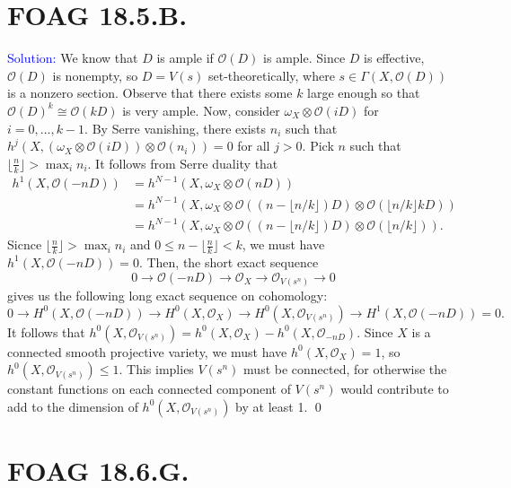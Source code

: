 \documentclass[11pt]{article}
\newcommand{\cO}{\mathcal{O}}
\newenvironment{solution}{\begin{trivlist}\item[]{\textcolor{blue}{Solution:}}}{\qed \end{trivlist}}
\begin{document}
\newpage

\section*{FOAG 18.5.B.}

\begin{solution}
    We know that $D$ is ample if $\cO(D)$ is ample. Since $D$ is effective, $\cO(D)$ is nonempty, so $D = V(s)$ set-theoretically, where $s \in \Gamma(X, \cO(D))$ is a nonzero section. Observe that there exists some $k$ large enough so that $\cO(D)^k \cong \cO(kD)$ is very ample. Now, consider $\omega_X \otimes \cO(iD)$ for $i = 0, \ldots, k-1$. By Serre vanishing, there exists $n_i$ such that $h^j(X, (\omega_X \otimes \cO(iD)) \otimes \cO(n_i)) = 0$ for all $j > 0$. Pick $n$ such that $\lfloor \frac{n}{k} \rfloor > \max_i n_i$. It follows from Serre duality that 
    \begin{align*}
        h^1 (X, \cO(-nD)) 
        &= h^{N-1} (X, \omega_X \otimes \cO(nD)) \\
        &= h^{N-1} (X, \omega_X \otimes \cO((n - \lfloor n/k \rfloor)D) \otimes \cO (\lfloor n/k \rfloor kD)) \\
        &= h^{N-1} (X, \omega_X \otimes \cO((n - \lfloor n/k \rfloor)D) \otimes \cO (\lfloor n/k \rfloor)).
    \end{align*}
    Sicnce $\lfloor \frac{n}{k} \rfloor > \max_i n_i$ and $0 \leq n - \lfloor \frac{n}{k} \rfloor < k$, we must have $h^1(X, \cO(-nD)) = 0$. Then, the short exact sequence 
    \[
        0 \longrightarrow \cO(-nD) \longrightarrow \cO_X \longrightarrow \cO_{V(s^n)} \longrightarrow 0
    \]
    gives us the following long exact sequence on cohomology:
    \[
        0 \longrightarrow H^0(X, \cO(-nD)) \longrightarrow H^0(X, \cO_X) \longrightarrow H^0(X, \cO_{V(s^n)}) \longrightarrow H^1(X, \cO(-nD)) = 0.
    \]
    It follows that $h^0(X, \cO_{V(s^n)}) = h^0(X, \cO_X) - h^0(X, \cO_{-nD})$. Since $X$ is a connected smooth projective variety, we must have $h^0(X, \cO_X) = 1$, so $h^0(X, \cO_{V(s^n)}) \leq 1$. This implies $V(s^n)$ must be connected, for otherwise the constant functions on each connected component of $V(s^n)$ would contribute to add to the dimension of $h^0(X, \cO_{V(s^n)})$ by at least 1.
\end{solution}

\newpage

\section*{FOAG 18.6.G.}
\end{document}
